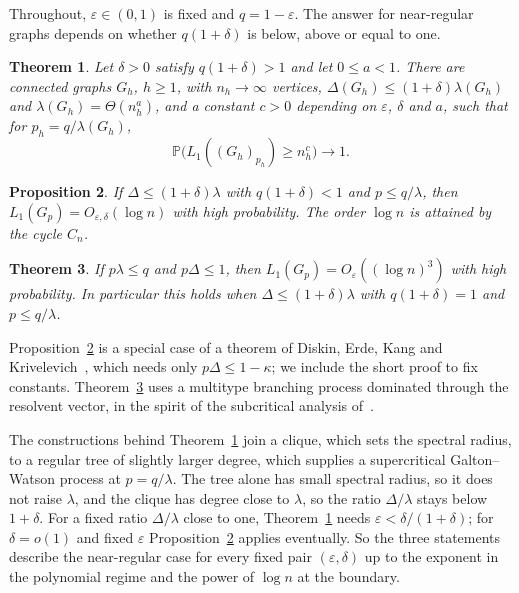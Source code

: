 \documentclass[11pt]{amsart}
\newtheorem{theorem}{Theorem}[section]
\newtheorem{proposition}[theorem]{Proposition}
\theoremstyle{remark}
\newcommand{\PP}{\mathbb{P}}
\begin{document}
Throughout, $\varepsilon\in(0,1)$ is fixed and $q=1-\varepsilon$. The answer for near-regular graphs depends on whether
$q(1+\delta)$ is below, above or equal to one.

\begin{theorem}\label{thm:lower}
Let $\delta>0$ satisfy $q(1+\delta)>1$ and let $0\le a<1$. There are connected graphs $G_h$, $h\ge1$, with
$n_h\to\infty$ vertices, $\Delta(G_h)\le(1+\delta)\lambda(G_h)$ and $\lambda(G_h)=\Theta(n_h^{a})$, and a constant
$c>0$ depending on $\varepsilon$, $\delta$ and $a$, such that for $p_h=q/\lambda(G_h)$,
\[
\PP\bigl(L_1((G_h)_{p_h})\ge n_h^{c}\bigr)\to1.
\]
\end{theorem}

\begin{proposition}\label{prop:strict}
If $\Delta\le(1+\delta)\lambda$ with $q(1+\delta)<1$ and $p\le q/\lambda$, then $L_1(G_p)=O_{\varepsilon,\delta}(\log
n)$ with high probability. The order $\log n$ is attained by the cycle $C_n$.
\end{proposition}

\begin{theorem}\label{thm:boundary}
If $p\lambda\le q$ and $p\Delta\le1$, then $L_1(G_p)=O_\varepsilon((\log n)^3)$ with high probability. In particular
this holds when $\Delta\le(1+\delta)\lambda$ with $q(1+\delta)=1$ and $p\le q/\lambda$.
\end{theorem}

Proposition~\ref{prop:strict} is a special case of a theorem of Diskin, Erde, Kang and
Krivelevich~\cite[Theorem~2]{DEKK25}, which needs only $p\Delta\le1-\kappa$; we include the short proof to fix
constants. Theorem~\ref{thm:boundary} uses a multitype branching process dominated through the resolvent vector, in the
spirit of the subcritical analysis of~\cite[Theorem~3]{BBCR10}.

The constructions behind Theorem~\ref{thm:lower} join a clique, which sets the spectral radius, to a regular tree of
slightly larger degree, which supplies a supercritical Galton--Watson process at $p=q/\lambda$. The tree alone has small
spectral radius, so it does not raise $\lambda$, and the clique has degree close to $\lambda$, so the ratio
$\Delta/\lambda$ stays below $1+\delta$. For a fixed ratio $\Delta/\lambda$ close to one, Theorem~\ref{thm:lower} needs
$\varepsilon<\delta/(1+\delta)$; for $\delta=o(1)$ and fixed $\varepsilon$ Proposition~\ref{prop:strict} applies
eventually. So the three statements describe the near-regular case for every fixed pair $(\varepsilon,\delta)$ up to
the exponent in the polynomial regime and the power of $\log n$ at the boundary.
\end{document}
